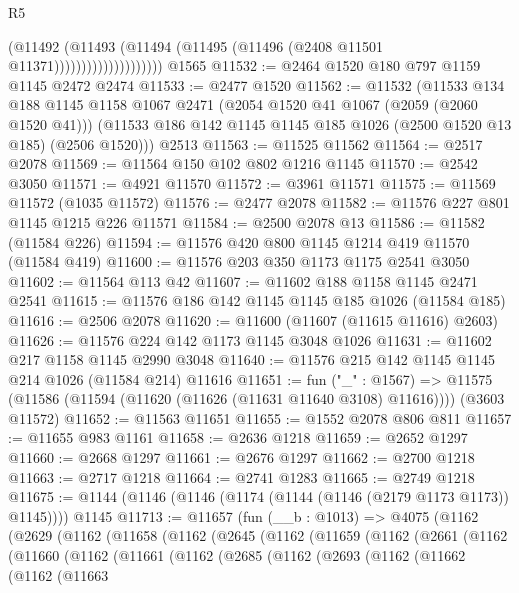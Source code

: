 \begin{lexlean}{R5}
\begin{coremodule}
                                (@11492
                                  (@11493
                                    (@11494 (@11495 (@11496 (@2408 @11501 @11371))))))))))))))))))))
    @1565
@11532 := @2464 @1520 @180 @797 @1159 @1145 @2472 @2474
@11533 := @2477 @1520
@11562 := @11532
    (@11533
      @134
      @188
      @1145
      @1158
      @1067
      @2471
      (@2054 @1520 @41 @1067 (@2059 (@2060 @1520 @41)))
      (@11533 @186 @142 @1145 @1145 @185 @1026 (@2500 @1520 @13 @185) (@2506 @1520)))
    @2513
@11563 := @11525 @11562
@11564 := @2517 @2078
@11569 := @11564 @150 @102 @802 @1216 @1145
@11570 := @2542 @3050
@11571 := @4921 @11570
@11572 := @3961 @11571
@11575 := @11569 @11572 (@1035 @11572)
@11576 := @2477 @2078
@11582 := @11576 @227 @801 @1145 @1215 @226 @11571
@11584 := @2500 @2078 @13
@11586 := @11582 (@11584 @226)
@11594 := @11576 @420 @800 @1145 @1214 @419 @11570 (@11584 @419)
@11600 := @11576 @203 @350 @1173 @1175 @2541 @3050
@11602 := @11564 @113 @42
@11607 := @11602 @188 @1158 @1145 @2471 @2541
@11615 := @11576 @186 @142 @1145 @1145 @185 @1026 (@11584 @185)
@11616 := @2506 @2078
@11620 := @11600 (@11607 (@11615 @11616) @2603)
@11626 := @11576 @224 @142 @1173 @1145 @3048 @1026
@11631 := @11602 @217 @1158 @1145 @2990 @3048
@11640 := @11576 @215 @142 @1145 @1145 @214 @1026 (@11584 @214) @11616
@11651 := fun ("_" : @1567) =>
  @11575 (@11586 (@11594 (@11620 (@11626 (@11631 @11640 @3108) @11616)))) (@3603 @11572)
@11652 := @11563 @11651
@11655 := @1552 @2078 @806 @811
@11657 := @11655 @983 @1161
@11658 := @2636 @1218
@11659 := @2652 @1297
@11660 := @2668 @1297
@11661 := @2676 @1297
@11662 := @2700 @1218
@11663 := @2717 @1218
@11664 := @2741 @1283
@11665 := @2749 @1218
@11675 := @1144 (@1146 (@1146 (@1174 (@1144 (@1146 (@2179 @1173 @1173)) @1145)))) @1145
@11713 := @11657
    (fun (__b : @1013) =>
    @4075
      (@1162
        (@2629
          (@1162
            (@11658
              (@1162
                (@2645
                  (@1162
                    (@11659
                      (@1162
                        (@2661
                          (@1162
                            (@11660
                              (@1162
                                (@11661
                                  (@1162
                                    (@2685
                                      (@1162
                                        (@2693
                                          (@1162
                                            (@11662
                                              (@1162
                                                (@11663

\end{coremodule}
\end{lexlean}
